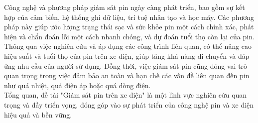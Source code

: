 \documentclass[a4paper,13pt]{article}
\theoremstyle{mytheor}
\begin{document}
Công nghệ và phương pháp giám sát pin ngày càng phát triển, bao gồm sự kết hợp của cảm biến, hệ thống ghi dữ liệu, trí tuệ nhân tạo và học máy. Các phương pháp này giúp ước lượng trạng thái sạc và sức khỏe pin một cách chính xác, phát hiện và chẩn đoán lỗi một cách nhanh chóng, và dự đoán tuổi thọ còn lại của pin.\\

Thông qua việc nghiên cứu và áp dụng các công trình liên quan, có thể nâng cao hiệu suất và tuổi thọ của pin trên xe điện, giúp tăng khả năng di chuyển và đáp ứng nhu cầu của người sử dụng. Đồng thời, việc giám sát pin cũng đóng vai trò quan trọng trong việc đảm bảo an toàn và hạn chế các vấn đề liên quan đến pin như quá nhiệt, quá điện áp hoặc quá dòng điện.\\

Tổng quan, đề tài "Giám sát pin trên xe điện" là một lĩnh vực nghiên cứu quan trọng và đầy triển vọng, đóng góp vào sự phát triển của công nghệ pin và xe điện hiệu quả và bền vững.\\
\end{document}
